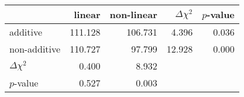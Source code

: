 \begin{center}
\begin{tabular}{l|rrrr}
  \hline
                  & linear & non-linear & $\Delta\chi^2$ & $p$-value \\ 
  \hline
additive          & 111.128 & 106.731 & 4.396 & 0.036 \\ 
non-additive      & 110.727 & 97.799 & 12.928 & 0.000 \\ 
  $\Delta\chi^2$  & 0.400   & 8.932 &  &  \\ 
  $p$-value       & 0.527   & 0.003 &  &  \\ 
   \hline
\end{tabular}
\end{center}
